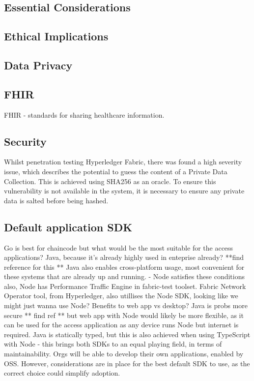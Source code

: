 \documentclass{report}
\begin{document}
\begin{flushleft}
\chapter{Essential Considerations}

\section{Ethical Implications}

\section{Data Privacy}

\section{FHIR}
FHIR - standards for sharing healthcare information.\linebreak[1]

\section{Security}
Whilst penetration testing Hyperledger Fabric, there was found a high severity issue, which describes the potential to guess the content of a Private Data Collection.
This is achieved using SHA256 as an oracle. To ensure this vulnerability is not available in the system, it is necessary to ensure any private data is salted before being hashed. \cite{shaw_penetration_2019}


\section{Default application SDK}
Go is best for chaincode but what would be the most suitable for the access applications? Java, because it's already highly used in enteprise already? **find reference for this ** 
Java also enables cross-platform usage, most convenient for these systems that are already up and running. - Node satisfies these conditions also, Node has Performance Traffic Engine in fabric-test toolset.
Fabric Network Operator tool, from Hyperledger, also utillises the Node SDK, looking like we might just wanna use Node? Benefits to web app vs desktop? 
Java is probs more secure ** find ref ** but web app with Node would likely be more flexible, as it can be used for the access application as any device runs Node but internet is required.
Java is statically typed, but this is also achieved when using TypeScript with Node - this brings both SDKs to an equal playing field, in terms of maintainability.
Orgs will be able to develop their own applications, enabled by OSS. However, considerations are in place for the best default SDK to use, as the correct choice could simplify adoption.


\end{flushleft}
\end{document}

